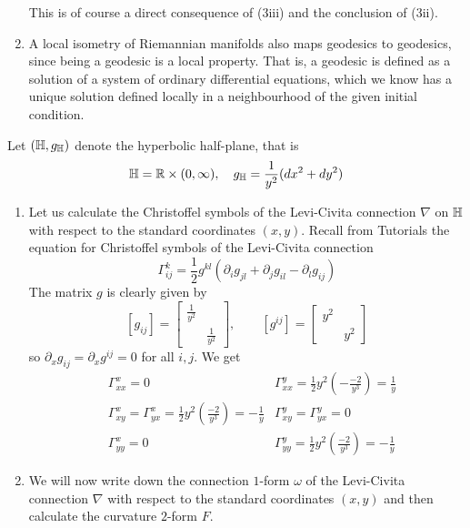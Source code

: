 \documentclass[a4paper, 12pt]{article}
\begin{document}
\begin{Exercise}
\begin{enumerate}[label=(\roman*)]
            This is of course a direct consequence of (3iii) and the conclusion of (3ii).
        \item A local isometry of Riemannian manifolds also maps geodesics to geodesics,
            since being a geodesic is a local property.
            That is, a geodesic is defined as a solution of a system of ordinary differential equations,
            which we know has a unique solution defined locally in a neighbourhood of the given initial condition.
    \end{enumerate}
\end{Exercise}

\begin{Exercise}
    Let $(\mathbb{H}, g_{\mathbb{H}})$ denote the hyperbolic half-plane, that is
    \[
        \mathbb{H} = \mathbb{R} \times (0, \infty), \quad g_{\mathbb{H}} = \frac{1}{y^2}(dx^2 + dy^2)
    \]
    \begin{enumerate}[label=(\roman*)]
        \item Let us calculate the Christoffel symbols of the Levi-Civita connection $\nabla$ on $\mathbb{H}$ with respect to the standard coordinates $(x, y)$.
            Recall from Tutorials the equation for Christoffel symbols of the Levi-Civita connection
            \[
                \Gamma_{ij}^k = \frac{1}{2}g^{kl} (\partial_i g_{jl} + \partial_j g_{il} - \partial_l g_{ij})
            \]
            The matrix $g$ is clearly given by
            \[
                [g_{ij}] =
                \begin{bmatrix}
                    \frac{1}{y^2} & \\
                    & \frac{1}{y^2}
                \end{bmatrix}
                ,\quad \quad
                [g^{ij}] =
                \begin{bmatrix}
                    y^2 & \\
                    & y^2
                \end{bmatrix}
            \]
            so $\partial_x g_{ij} = \partial_x g^{ij} = 0$ for all $i,j$.
            We get
            \begin{align*}
                &\Gamma_{xx}^x = 0
                &\Gamma_{xx}^y = \frac{1}{2} y^2 (-\frac{-2}{y^3}) = \frac{1}{y} \\
                &\Gamma_{xy}^x = \Gamma_{yx}^x = \frac{1}{2} y^2 (\frac{-2}{y^3}) = -\frac{1}{y}
                &\Gamma_{xy}^y = \Gamma_{yx}^y = 0 \\
                &\Gamma_{yy}^x = 0
                &\Gamma_{yy}^y = \frac{1}{2} y^2 (\frac{-2}{y^3}) = -\frac{1}{y}
            \end{align*}
        \item We will now write down the connection $1$-form $\omega$ of the
            Levi-Civita connection $\nabla$ with respect to the standard
            coordinates $(x, y)$ and then calculate the curvature $2$-form $F$.


\end{enumerate}
\end{Exercise}
\end{document}
